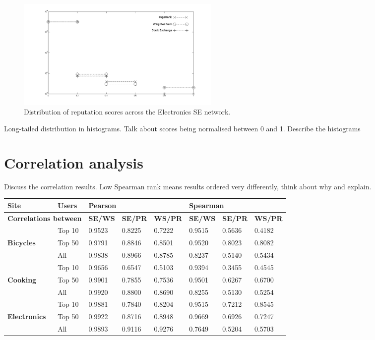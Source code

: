 \documentclass[]{final_report}
\begin{document}
\begin{figure}[ht!]
\centering
\includegraphics[width=100mm]{chap3/electronics_hist.png}
\caption{Distribution of reputation scores across the Electronics SE network.}
\end{figure}\label{gra:electronicshist}

Long-tailed distribution in histograms. Talk about scores being normalised between 0 and 1. Describe the histograms

\section{Correlation analysis}

Discuss the correlation results. Low Spearman rank means results ordered very differently, think about why and explain.

\begin{minipage}{\linewidth}
\centering
\begin{tabular}{|l|l||l|l|l||l|l|l|}
\hline
\textbf{Site} & \textbf{Users} & \multicolumn{3}{l||}{\textbf{Pearson}} & \multicolumn{3}{l|}{\textbf{Spearman}} \\ \hline
\multicolumn{2}{|l||}{\textbf{Correlations between}} & \textbf{SE/WS} & \textbf{SE/PR} & \textbf{WS/PR} & \textbf{SE/WS} & \textbf{SE/PR} & \textbf{WS/PR} \\
\hline
~ 					& Top 10 & 0.9523 & 0.8225 & 0.7222 & 0.9515 & 0.5636 & 0.4182 \\      
\textbf{Bicycles}	& Top 50 & 0.9791 & 0.8846 & 0.8501 & 0.9520 & 0.8023 & 0.8082 \\
~ 					& All    & 0.9838 & 0.8966 & 0.8785 & 0.8237 & 0.5140 & 0.5434 \\
\hline
~           		& Top 10 & 0.9656 & 0.6547 & 0.5103 & 0.9394 & 0.3455 & 0.4545 \\
\textbf{Cooking}    & Top 50 & 0.9901 & 0.7855 & 0.7536 & 0.9501 & 0.6267 & 0.6700 \\
~          			& All    & 0.9920 & 0.8800 & 0.8690 & 0.8255 & 0.5130 & 0.5254 \\
\hline
~           		& Top 10 & 0.9881 & 0.7840 & 0.8204 & 0.9515 & 0.7212 & 0.8545 \\
\textbf{Electronics}& Top 50 & 0.9922 & 0.8716 & 0.8948 & 0.9669 & 0.6926 & 0.7247 \\
~           		& All    & 0.9893 & 0.9116 & 0.9276 & 0.7649 & 0.5204 & 0.5703 \\
\hline
\end{tabular}\par
{} \label{tab:corrresults}
\end{minipage}
\end{document}
